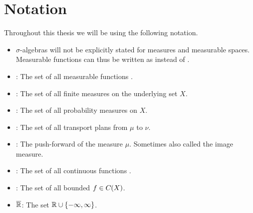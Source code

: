 \chapter*{Notation}

Throughout this thesis we will be using the following notation.

\begin{itemize}
	\item $\sigma$-algebras will not be explicitly stated for measures and measurable spaces. Measurable functions can thus be written as  instead of .
	\item {}: The set of all measurable functions .
	\item {}: The set of all finite measures on the underlying set $X$.
	\item {}: The set of all probability measures on $X$.
	\item \TP{\mu}{\nu}: The set of all transport plans from $\mu$ to $\nu$.
	\item \push{\mu}: The push-forward of the measure $\mu$. Sometimes also called the image measure.
	\item {}: The set of all continuous functions .
	\item {}: The set of all bounded $f \in C_{}(X)$.
	\item $\overline{\mathbb{R}}$: The set $\mathbb{R} \cup \{ -\infty, \infty \}$.
\end{itemize}